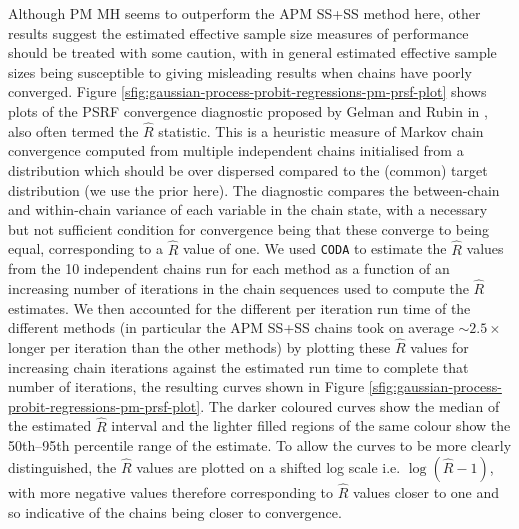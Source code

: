 Although \ac{PM} \ac{MH} seems to outperform the \ac{APM} \ac{SS}+\ac{SS} method here, other results suggest the estimated effective sample size measures of performance should be treated with some caution, with in general estimated effective sample sizes being susceptible to giving misleading results when chains have poorly converged. Figure \ref{sfig:gaussian-process-probit-regressions-pm-prsf-plot} shows plots of the \ac{PSRF} convergence diagnostic proposed by Gelman and Rubin in \citep{gelman1992inference}, also often termed the $\hat{R}$ statistic. This is a heuristic measure of Markov chain convergence computed from multiple independent chains initialised from a distribution which should be over dispersed compared to the (common) target distribution (we use the prior here). The diagnostic compares the between-chain and within-chain variance of each variable in the chain state, with a necessary but not sufficient condition for convergence being that these converge to being equal, corresponding to a $\hat{R}$ value of one. We used \texttt{CODA} to estimate the $\hat{R}$ values from the 10 independent chains run for each method as a function of an increasing number of iterations in the chain sequences used to compute the $\hat{R}$ estimates. We then accounted for the different per iteration run time of the different methods (in particular the \ac{APM} \ac{SS}+\ac{SS} chains took on average $\sim 2.5\times$ longer per iteration than the other methods) by plotting these $\hat{R}$ values for increasing chain iterations against the estimated run time to complete that number of iterations, the resulting curves shown in Figure \ref{sfig:gaussian-process-probit-regressions-pm-prsf-plot}. The darker coloured curves show the median of the estimated $\hat{R}$ interval and the lighter filled regions of the same colour show the 50th--95th percentile range of the estimate. To allow the curves to be more clearly distinguished, the $\hat{R}$ values are plotted on a shifted log scale i.e. $\log(\hat{R} - 1)$, with more negative values therefore corresponding to $\hat{R}$ values closer to one and so indicative of the chains being closer to convergence.

